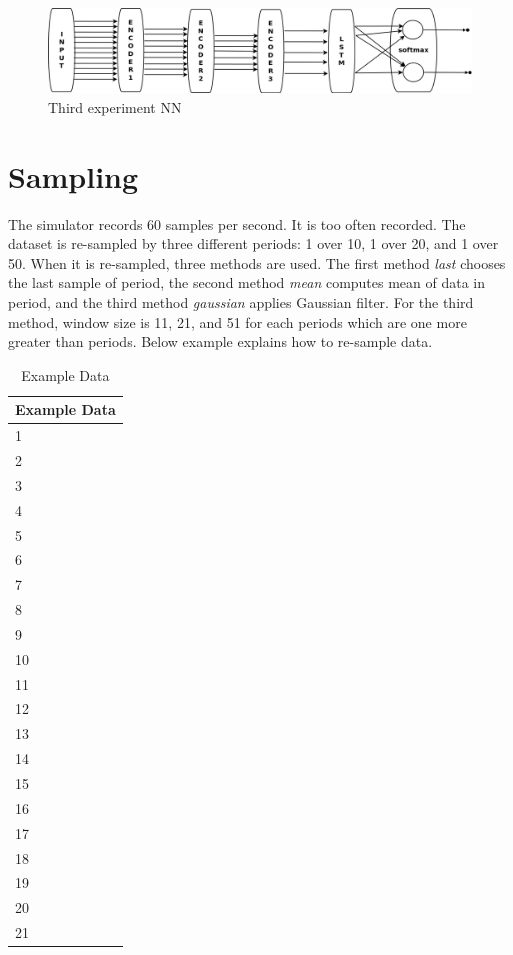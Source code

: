 \documentclass[draft,dvipsnames]{drexel-thesis}
\begin{document}
\begin{thesis}
\begin{figure}[t!]
    \centering
    \includegraphics[width=\textwidth]{pictures/figures/exp_NN3.png}
    \caption{Third experiment NN}
    \label{fig:exp_NN3}
\end{figure}


\section{Sampling}
The simulator records 60 samples per second. It is too often recorded. The dataset is re-sampled by three different periods: 1 over 10, 1 over 20, and 1 over 50. When it is re-sampled, three methods are used. The first method {\em last} chooses the last sample of period, the second method {\em mean} computes mean of data in period, and the third method {\em gaussian} applies Gaussian filter. For the third method, window size is 11, 21, and 51 for each periods which are one more greater than periods. Below example explains how to re-sample data.

\begin{table}[!t]
\centering
\caption{Example Data}
\label{tbl:example_data}
\begin{tabular}{|l|}
\hline
Example Data \\ \hline
1            \\
2            \\
3            \\
4            \\
5            \\
6            \\
7            \\
8            \\
9            \\
10           \\
11           \\
12           \\
13           \\
14           \\
15           \\
16           \\
17           \\
18           \\
19           \\
20           \\
21           \\ \hline
\end{tabular}
\end{table}


\end{thesis}
\end{document}
